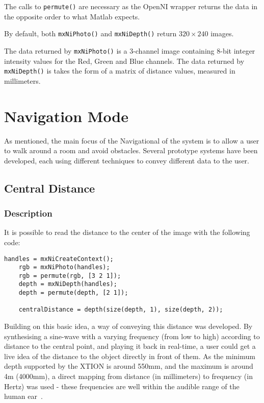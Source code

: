 The calls to \lstinline|permute()| are necessary as the OpenNI wrapper returns the data in the opposite order to what Matlab expects.

By default, both \lstinline|mxNiPhoto()| and \lstinline|mxNiDepth()| return $320\times240$ images.

The data returned by \lstinline|mxNiPhoto()| is a 3-channel image containing 8-bit integer intensity values for the Red, Green and Blue channels.
The data returned by \lstinline|mxNiDepth()| is takes the form of a matrix of distance values, measured in millimeters.

\section{Navigation Mode}
As mentioned, the main focus of the Navigational of the system is to allow a user to walk around a room and avoid obstacles. Several prototype systems have been developed, each using different techniques to convey different data to the user.

\subsection{Central Distance}
\label{sec:centraldistance}
\subsubsection{Description}
It is possible to read the distance to the center of the image with the following code:

\begin{lstlisting}[caption = {Reading depth of image center}] 
    handles = mxNiCreateContext();
    rgb = mxNiPhoto(handles);
    rgb = permute(rgb, [3 2 1]);
    depth = mxNiDepth(handles);
    depth = permute(depth, [2 1]);
    
    centralDistance = depth(size(depth, 1), size(depth, 2));
\end{lstlisting}


Building on this basic idea, a way of conveying this distance was developed. By synthesising a sine-wave with a varying frequency (from low to high) according to distance to the central point, and playing it back in real-time, a user could get a live idea of the distance to the object directly in front of them. As the minimum depth supported by the XTION is around 550mm, and the maximum is around 4m (4000mm), a direct mapping from distance (in millimeters) to frequency (in Hertz) was used - these frequencies are well within the audible range of the human ear~\cite{hearingrange}.

